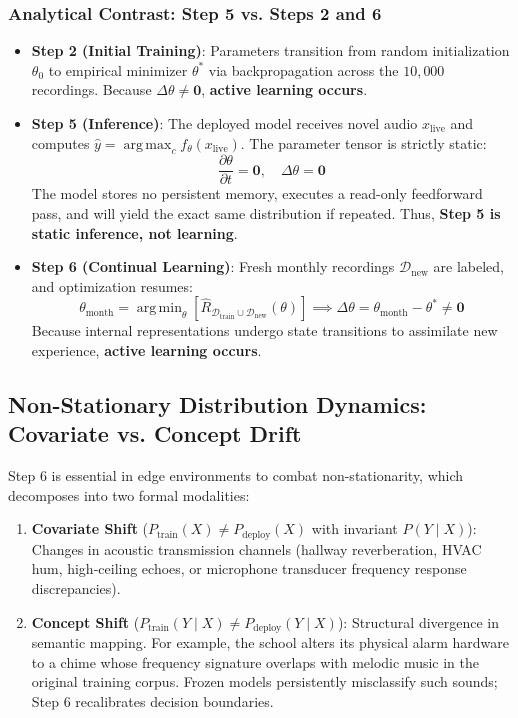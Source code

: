 \documentclass[11pt,a4paper]{article}
\theoremstyle{definition}
\theoremstyle{plain}
\theoremstyle{remark}
\DeclareMathOperator*{\argmax}{arg\,max}
\DeclareMathOperator*{\argmin}{arg\,min}
\begin{document}
\subsubsection{Analytical Contrast: Step 5 vs. Steps 2 and 6}
\begin{itemize}
    \item \textbf{Step 2 (Initial Training)}: Parameters transition from random initialization $\theta_0$ to empirical minimizer $\theta^*$ via backpropagation across the $10{,}000$ recordings. Because $\Delta \theta \neq \mathbf{0}$, \textbf{active learning occurs}.
    \item \textbf{Step 5 (Inference)}: The deployed model receives novel audio $x_{\text{live}}$ and computes $\hat{y} = \argmax_{c} f_\theta(x_{\text{live}})$. The parameter tensor is strictly static:
    \begin{equation}
    \frac{\partial \theta}{\partial t} = \mathbf{0}, \quad \Delta \theta = \mathbf{0}
    \end{equation}
    The model stores no persistent memory, executes a read-only feedforward pass, and will yield the exact same distribution if repeated. Thus, \textbf{Step 5 is static inference, not learning}.
    \item \textbf{Step 6 (Continual Learning)}: Fresh monthly recordings $\mathcal{D}_{\text{new}}$ are labeled, and optimization resumes:
    \begin{equation}
    \theta_{\text{month}} = \argmin_{\theta} \left[ \hat{R}_{\mathcal{D}_{\text{train}} \cup \mathcal{D}_{\text{new}}}(\theta) \right] \implies \Delta \theta = \theta_{\text{month}} - \theta^* \neq \mathbf{0}
    \end{equation}
    Because internal representations undergo state transitions to assimilate new experience, \textbf{active learning occurs}.
\end{itemize}

\subsection{Non-Stationary Distribution Dynamics: Covariate vs. Concept Drift}
Step 6 is essential in edge environments to combat non-stationarity, which decomposes into two formal modalities:
\begin{enumerate}
    \item \textbf{Covariate Shift} ($P_{\text{train}}(X) \neq P_{\text{deploy}}(X)$ with invariant $P(Y \mid X)$):
    Changes in acoustic transmission channels (hallway reverberation, HVAC hum, high-ceiling echoes, or microphone transducer frequency response discrepancies).
    \item \textbf{Concept Shift} ($P_{\text{train}}(Y \mid X) \neq P_{\text{deploy}}(Y \mid X)$):
    Structural divergence in semantic mapping. For example, the school alters its physical alarm hardware to a chime whose frequency signature overlaps with melodic music in the original training corpus. Frozen models persistently misclassify such sounds; Step 6 recalibrates decision boundaries.
\end{enumerate}
\end{document}
